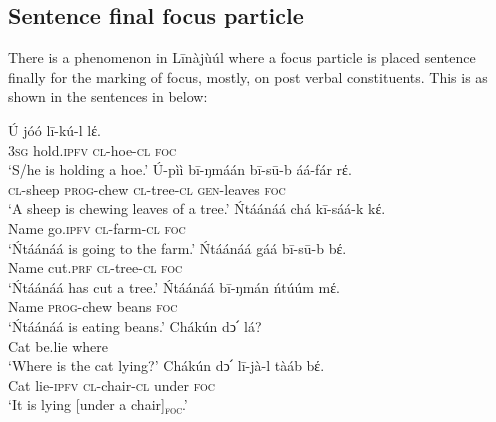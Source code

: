\documentclass[output=paper,colorlinks,citecolor=brown]{langscibook}
\begin{document}
\subsection{Sentence final focus particle}\label{sec:bisilki:5.3}

There is a phenomenon in Līnàjùúl where a focus particle is placed sentence finally for the marking of focus, mostly, on post verbal constituents. This is as shown in the sentences in  below:

\ea%
    \label{ex:bisilki:17}
    \ea\label{ex:bisilki:17a}
    \gll    Ú	jóó		lī-kú-l		lέ.\\
            \textsc{3sg}	hold\textsc{.ipfv}	\textsc{cl-}hoe\textsc{-cl}	\textsc{foc}\\
    \glt    ‘S/he is holding a hoe.’
    \ex\label{ex:bisilki:17b}
    \gll    Ú-pìì	bī-ŋmáán	bī-sū-b		áá-fár		rέ.\\
            \textsc{cl-}sheep	\textsc{prog-}chew	\textsc{cl-}tree\textsc{-cl}	\textsc{gen-}leaves	\textsc{foc}\\
    \glt    ‘A sheep is chewing leaves of a tree.’
    \ex\label{ex:bisilki:17c}
    \gll    Ńtáánáá	chá		kī-sáá-k		kέ.\\
            Name		go\textsc{.ipfv}	\textsc{cl-}farm\textsc{-cl}		\textsc{foc}\\
    \glt    ‘Ńtáánáá is going to the farm.’
    \ex\label{ex:bisilki:17d}
    \gll    Ńtáánáá	gáá		bī-sū-b	bέ.\\
            Name		cut\textsc{.prf}	\textsc{cl-}tree\textsc{-cl}	\textsc{foc}\\
    \glt    ‘Ńtáánáá has cut a tree.’
    \ex\label{ex:bisilki:17e}
    \gll    Ńtáánáá	bī-ŋmán	ńtúúm			mέ.\\
            Name		\textsc{prog-}chew	beans			\textsc{foc}\\
    \glt    ‘Ńtáánáá is eating beans.’
    \ex\label{ex:bisilki:17f}
        \ea\label{ex:bisilki:17fi}
        \gll    Chákún	dↄ՛		lá?\\
                Cat		be.lie		where\\
        \glt    ‘Where is the cat lying?’
        \ex\label{ex:bisilki:17fii}
        \gll    Chákún	dↄ՛		lī-jà-l		tàáb	bέ.\\
            Cat		lie\textsc{-ipfv}	\textsc{cl-}chair\textsc{-cl}	under	\textsc{foc}\\
        \glt    ‘It is lying [under a chair]\textsubscript{\textsc{foc}}.’
        \z
    \z
\z
\end{document}

